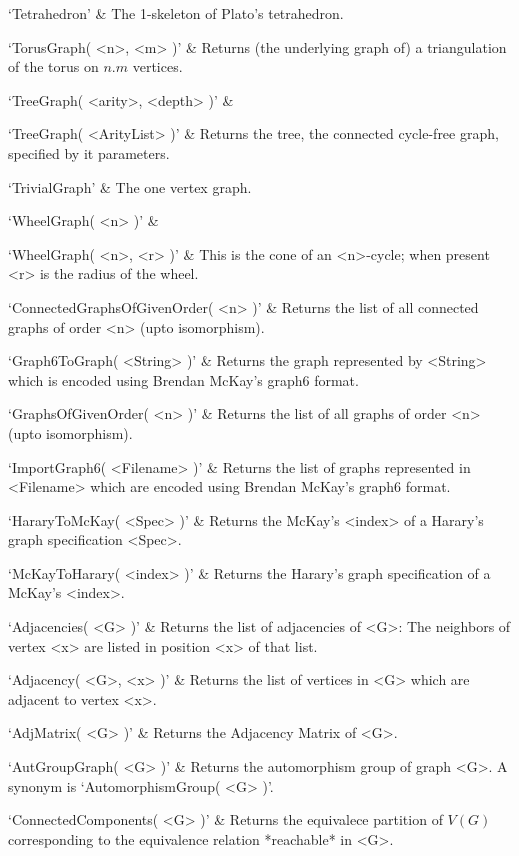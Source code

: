 `Tetrahedron' & 
The 1-skeleton of Plato's tetrahedron.

`TorusGraph( <n>, <m> )' &
Returns (the underlying graph of) a triangulation of the torus on $n.m$ vertices.

`TreeGraph( <arity>, <depth> )' &

`TreeGraph( <ArityList> )' &
Returns the tree, the connected cycle-free graph, specified by it parameters.

`TrivialGraph' & 
The one vertex graph.

`WheelGraph( <n> )' & 

`WheelGraph( <n>, <r> )' & 
This  is  the   cone  of  an  <n>-cycle; when present <r> is the radius of the wheel.
\enditems



\beginitems
`ConnectedGraphsOfGivenOrder( <n> )' &
Returns the list of all connected graphs of order <n> (upto isomorphism).

`Graph6ToGraph( <String> )' &
Returns the graph represented by <String> which is encoded using Brendan McKay's graph6 format. 

`GraphsOfGivenOrder( <n> )' &
Returns the list of all graphs of order <n> (upto isomorphism). 

`ImportGraph6( <Filename> )' &
Returns the list of graphs represented in <Filename> which are encoded using Brendan McKay's graph6 format.

`HararyToMcKay( <Spec> )' &
Returns the McKay's <index> of a Harary's graph specification <Spec>.

`McKayToHarary( <index> )' &
Returns the Harary's graph specification of a McKay's <index>.

\enditems



\beginitems
`Adjacencies( <G> )' & 
Returns the list of adjacencies of <G>: The neighbors of vertex <x> are listed in position <x> of that list.

`Adjacency( <G>, <x> )' & 
Returns the list of vertices in <G> which are adjacent to vertex <x>.

`AdjMatrix( <G> )' & 
Returns the Adjacency Matrix of <G>.

`AutGroupGraph( <G> )' & 
Returns the automorphism group of graph <G>. A synonym is `AutomorphismGroup( <G> )'.

`ConnectedComponents( <G> )' & 
Returns the equivalece partition of $V(G)$ corresponding to the equivalence relation *reachable* in <G>.


